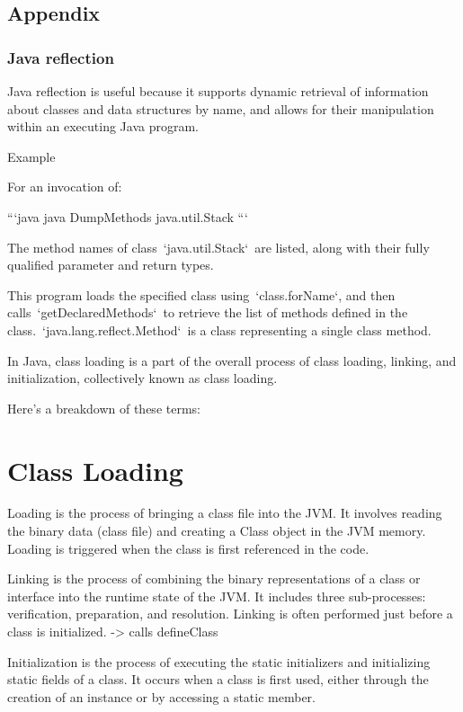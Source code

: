 \subsection{Appendix}

\subsubsection{Java reflection}
Java reflection is useful because it supports dynamic retrieval of information about classes and data structures by name, and allows for their manipulation within an executing Java program.

Example

For an invocation of:

```java
java DumpMethods java.util.Stack
```

The method names of class `java.util.Stack` are listed, along with their fully qualified parameter and return types.

This program loads the specified class using `class.forName`, and then calls `getDeclaredMethods` to retrieve the list of methods defined in the class. `java.lang.reflect.Method` is a class representing a single class method.


In Java, class loading is a part of the overall process of class loading, linking, and initialization, collectively known as class loading.

Here's a breakdown of these terms:

\section{Class Loading}

Loading is the process of bringing a class file into the JVM.
It involves reading the binary data (class file) and creating a Class object in the JVM memory.
Loading is triggered when the class is first referenced in the code.

Linking is the process of combining the binary representations of a class or interface into the runtime state of the JVM.
It includes three sub-processes: verification, preparation, and resolution.
Linking is often performed just before a class is initialized. -> calls defineClass

Initialization is the process of executing the static initializers and initializing static fields of a class.
It occurs when a class is first used, either through the creation of an instance or by accessing a static member.
